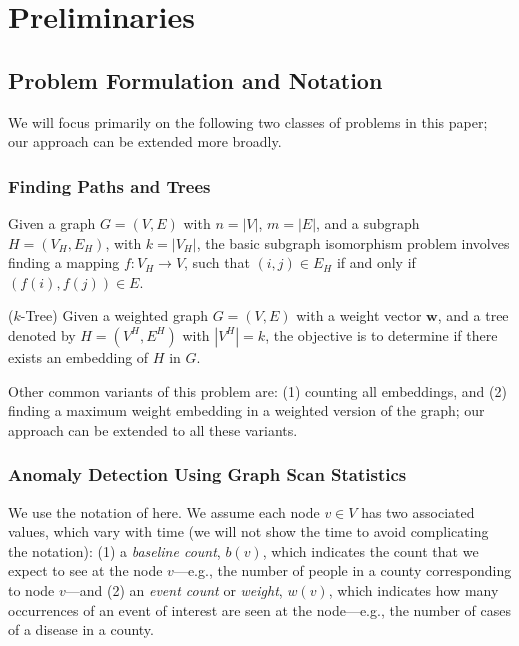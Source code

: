 \section{Preliminaries}
\label{sec:prelim}

\subsection{Problem Formulation and Notation}
We will focus primarily on the following two classes of problems in this paper; our
approach can be extended more broadly.

\noindent
\subsubsection{Finding Paths and Trees}
Given a graph $G=(V, E)$ with $n=|V|$, $m=|E|$, and a subgraph $H=(V_H, E_H)$, with $k=|V_H|$, the basic subgraph isomorphism problem involves finding a mapping $f:V_H\rightarrow V$,
such that $(i, j)\in E_H$ if and only if $(f(i), f(j))\in E$.

\begin{problem} ($k$-Tree)
\label{prob:trees}
Given a weighted graph $G=(V, E)$ with a weight vector $\mathbf{w}$, and a tree
denoted by $H=(V^H, E^H)$ with $|V^H|=k$, the objective is to determine if there exists
an embedding of $H$ in $G$.
\end{problem}

Other common variants of this problem are: (1) counting all embeddings, and (2) finding a maximum
weight embedding in a weighted version of the graph; our approach can be extended to all
these variants.


\noindent
\subsubsection{Anomaly Detection Using Graph Scan Statistics}
We use the notation of \cite{cadena:sdm17} here. We assume each node $v\in V$ has two associated values,
which vary with time (we will not show the time to avoid complicating the notation):
(1) a \emph{baseline count}, $b(v)$, which indicates the count that we
expect to see at the node $v$---e.g., the number of people in a county corresponding to node $v$---and
(2) an \emph{event count} or \emph{weight}, $w(v)$, which indicates how many occurrences of an event
of interest are seen at the node---e.g., the number of cases of a disease in a county.

